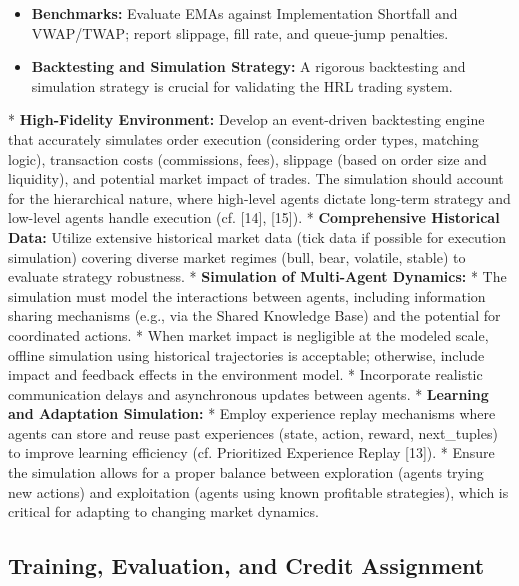 \documentclass[11pt]{article}
\begin{document}
\begin{itemize}
\item   \textbf{Benchmarks:} Evaluate EMAs against Implementation Shortfall and VWAP/TWAP; report slippage, fill rate, and queue-jump penalties.

\item   \textbf{Backtesting and Simulation Strategy:} A rigorous backtesting and simulation strategy is crucial for validating the HRL trading system.
\end{itemize}
    *   \textbf{High-Fidelity Environment:} Develop an event-driven backtesting engine that accurately simulates order execution (considering order types, matching logic), transaction costs (commissions, fees), slippage (based on order size and liquidity), and potential market impact of trades. The simulation should account for the hierarchical nature, where high-level agents dictate long-term strategy and low-level agents handle execution (cf. [14], [15]).
    *   \textbf{Comprehensive Historical Data:} Utilize extensive historical market data (tick data if possible for execution simulation) covering diverse market regimes (bull, bear, volatile, stable) to evaluate strategy robustness.
    *   \textbf{Simulation of Multi-Agent Dynamics:}
        *   The simulation must model the interactions between agents, including information sharing mechanisms (e.g., via the Shared Knowledge Base) and the potential for coordinated actions.
        *   When market impact is negligible at the modeled scale, offline simulation using historical trajectories is acceptable; otherwise, include impact and feedback effects in the environment model.
        *   Incorporate realistic communication delays and asynchronous updates between agents.
    *   \textbf{Learning and Adaptation Simulation:}
        *   Employ experience replay mechanisms where agents can store and reuse past experiences (state, action, reward, next\_{\text{\1}}\2tuples) to improve learning efficiency (cf. Prioritized Experience Replay [13]).
        *   Ensure the simulation allows for a proper balance between exploration (agents trying new actions) and exploitation (agents using known profitable strategies), which is critical for adapting to changing market dynamics.

\subsection{Training, Evaluation, and Credit Assignment}
\end{document}
